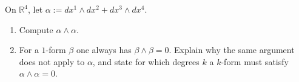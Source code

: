 \begin{aiexercise}
\label{ex:ai_wedge_square}
On $\mathbb{R}^4$, let $\alpha := dx^1\wedge dx^2 + dx^3\wedge dx^4$.
\begin{enumerate}[label=\textbf{(\alph*)}]
  \item Compute $\alpha\wedge\alpha$.
  \item For a $1$-form $\beta$ one always has $\beta\wedge\beta = 0$. Explain why the same
    argument does not apply to $\alpha$, and state for which degrees $k$ a $k$-form must satisfy
    $\alpha\wedge\alpha = 0$.
\end{enumerate}
\end{aiexercise}

